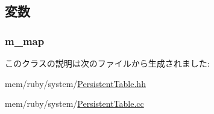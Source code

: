 \subsection{変数}
\hypertarget{classPersistentTable_a81aeb6fef4ddb55c4abc1662d977def1}{
\subsubsection[{m\_\-map}]{ {\bf m\_\-map}}}
\label{classPersistentTable_a81aeb6fef4ddb55c4abc1662d977def1}


このクラスの説明は次のファイルから生成されました:\begin{DoxyCompactItemize}
\item 
mem/ruby/system/\hyperlink{PersistentTable_8hh}{PersistentTable.hh}\item 
mem/ruby/system/\hyperlink{PersistentTable_8cc}{PersistentTable.cc}\end{DoxyCompactItemize}
